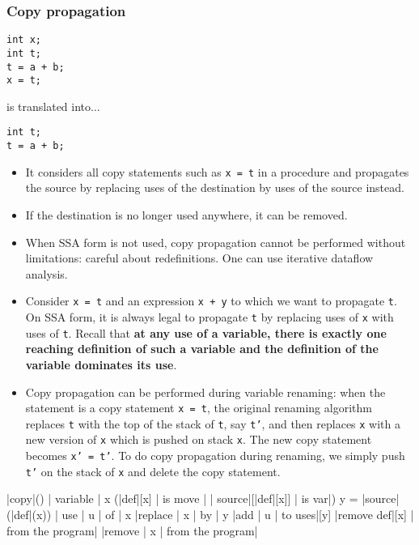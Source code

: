 \documentclass[a4paper,12pt, notitlepage]{article}
\begin{document}
\subsubsection*{Copy propagation}
\begin{verbatim}
int x;
int t;
t = a + b;
x = t;
\end{verbatim} \vspace{-0.3cm}
is translated into... \vspace{-0.3cm}
\begin{verbatim}
int t;
t = a + b;
\end{verbatim}

\begin{itemize}
\item It considers all copy statements such as \texttt{x = t} in a procedure and
propagates the source by replacing uses of the destination by uses of the source
instead.
\item If the destination is no longer used anywhere, it can be removed.
\item When SSA form is not used, copy propagation cannot be performed without
limitations: careful about redefinitions. One can use iterative dataflow
analysis.
\item Consider \texttt{x = t} and an expression \texttt{x + y} to which we want
to propagate \texttt{t}. On SSA form, it is always legal to propagate \texttt{t}
by replacing uses of \texttt{x} with uses of \texttt{t}. Recall that \textbf{at
any use of a variable, there is exactly one reaching definition of such a
variable and the definition of the variable dominates its use}.
\item Copy propagation can be performed during variable renaming: when the
statement is a copy statement \texttt{x = t}, the original renaming algorithm
replaces \texttt{t} with the top of the stack of \texttt{t}, say \texttt{t'},
and then replaces \texttt{x} with a new version of \texttt{x} which is
pushed on stack \texttt{x}. The new copy statement becomes \texttt{x' =
t'}. To do copy propagation during renaming, we simply push
\texttt{t'} on the stack of \texttt{x} and delete the copy
statement.
\end{itemize}
\begin{program}
\PROC |copy|() \BODY
    \FOREACH | variable | x \DO
        \IF (|def|[x] | is move | \land | source|[|def|[x]] | is var|) \AR*
            y = |source|(|def|(x))
            \FOREACH | use | u | of | x \DO
                |replace | x | by | y
                |add | u | to uses|[y]
            \OD
            |remove def|[x] | from the program|
            |remove | x | from the program|
\end{program}
\end{document}
